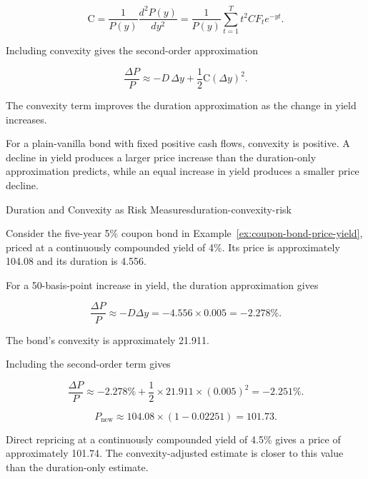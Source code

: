 \begin{equation}
\mathrm{C}
=
\frac{1}{P(y)}
\frac{d^2P(y)}{dy^2}
=
\frac{1}{P(y)}
\sum_{t=1}^{T}
t^2 CF_t e^{-yt}.
\label{eq:ch8-convexity}
\end{equation}

Including convexity gives the second-order approximation

\begin{equation}
\frac{\Delta P}{P}
\approx
-D\,\Delta y
+
\frac{1}{2}\mathrm{C}(\Delta y)^2.
\label{eq:ch8-duration-convexity-approx}
\end{equation}

The convexity term improves the duration approximation as the change in yield increases.

For a plain-vanilla bond with fixed positive cash flows, convexity is positive. A decline in yield produces a larger price increase than the duration-only approximation predicts, while an equal increase in yield produces a smaller price decline.

\begin{example}{Duration and Convexity as Risk Measures}{duration-convexity-risk}

Consider the five-year 5\% coupon bond in Example~\ref{ex:coupon-bond-price-yield}, priced at a continuously compounded yield of 4\%. Its price is approximately 104.08 and its duration is 4.556. 

For a 50-basis-point increase in yield, the duration approximation gives

\[
\frac{\Delta P}{P}
\approx
-D\Delta y
=
-4.556\times 0.005
=
-2.278\%.
\]

The bond's convexity is approximately 21.911.

Including the second-order term gives

\[
\frac{\Delta P}{P}
\approx
-2.278\%
+
\frac{1}{2}\times 21.911\times (0.005)^2
=
-2.251\%.
\]

\[
P_{\mathrm{new}}
\approx
104.08\times(1-0.02251)
=
101.73.
\]

Direct repricing at a continuously compounded yield
of 4.5\% gives a price of approximately 101.74.
The convexity-adjusted estimate is closer to this
value than the duration-only estimate.

\end{example}

